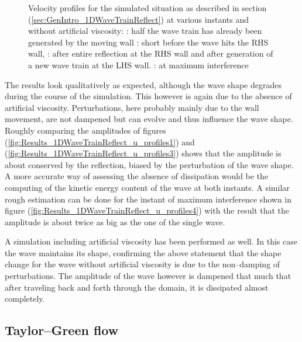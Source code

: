\documentclass[11pt,a4paper,twoside]{report}
\begin{document}
\begin{figure}[h]
\caption[Velocity profiles 1D reflected wave train]{Velocity profiles for the simulated situation as described in section (\ref{sec:GenIntro_1DWaveTrainReflect}) at various instants and without artificial viscosity: : half the wave train has already been generated by the moving wall : short before the wave hits the RHS wall, : after entire reflection at the RHS wall and after generation of a new wave train at the LHS wall. : at maximum interference}

\end{figure}

The results look qualitatively as expected, although the wave shape degrades during the course of the simulation. This however is again due to the absence of artificial viscosity. Perturbations, here probably mainly due to the wall movement, are not dampened but can evolve and thus influence the wave shape. 
Roughly comparing the amplitudes of figures (\ref{fig:Results_1DWaveTrainReflect_u_profiles1}) and (\ref{fig:Results_1DWaveTrainReflect_u_profiles3}) shows that the amplitude is about conserved by the reflection, biased by the perturbation of the wave shape. A more accurate way of assessing the absence of dissipation would be the computing of the kinetic energy content of the wave at both instants.  
A similar rough estimation can be done for the instant of maximum interference shown in figure (\ref{fig:Results_1DWaveTrainReflect_u_profiles4}) with the result that the amplitude is about twice as big as the one of the single wave. 




A simulation including artificial viscosity has been performed as well. In this case the wave maintains its shape, confirming the above statement that the shape change for the wave without artificial viscosity is due to the non--damping of perturbations. 
The amplitude of the wave however is dampened that much that after traveling back and forth through the domain, it is dissipated almost completely.




\subsection{Taylor--Green flow}
\label{sec:Results_TG}
\end{document}

